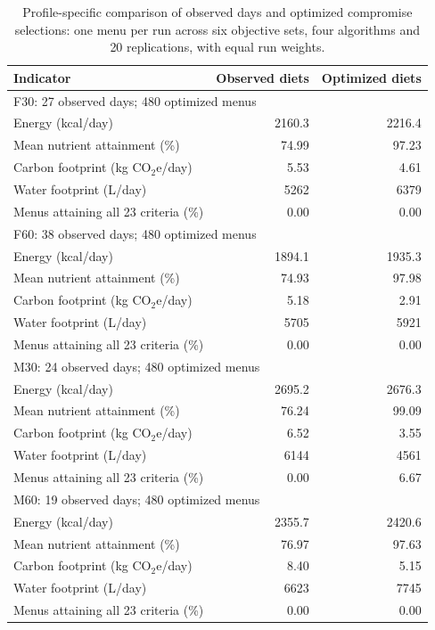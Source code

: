 \begin{table}[pos=h]
\centering\small
\caption{Profile-specific comparison of observed days and optimized compromise selections: one menu per run across six objective sets, four algorithms and 20 replications, with equal run weights.}
\label{tab:observed-profiles}
\begin{tabularx}{\textwidth}{Xrr}
\toprule
Indicator & Observed diets & Optimized diets \\
\midrule
\multicolumn{3}{l}{F30: 27 observed days; 480 optimized menus}\\
Energy (kcal/day) & 2160.3 & 2216.4 \\
\midrule
Mean nutrient attainment (\%) & 74.99 & 97.23 \\
\midrule
Carbon footprint (kg CO$_2$e/day) & 5.53 & 4.61 \\
\midrule
Water footprint (L/day) & 5262 & 6379 \\
\midrule
Menus attaining all 23 criteria (\%) & 0.00 & 0.00 \\
\midrule
\multicolumn{3}{l}{F60: 38 observed days; 480 optimized menus}\\
Energy (kcal/day) & 1894.1 & 1935.3 \\
\midrule
Mean nutrient attainment (\%) & 74.93 & 97.98 \\
\midrule
Carbon footprint (kg CO$_2$e/day) & 5.18 & 2.91 \\
\midrule
Water footprint (L/day) & 5705 & 5921 \\
\midrule
Menus attaining all 23 criteria (\%) & 0.00 & 0.00 \\
\midrule
\multicolumn{3}{l}{M30: 24 observed days; 480 optimized menus}\\
Energy (kcal/day) & 2695.2 & 2676.3 \\
\midrule
Mean nutrient attainment (\%) & 76.24 & 99.09 \\
\midrule
Carbon footprint (kg CO$_2$e/day) & 6.52 & 3.55 \\
\midrule
Water footprint (L/day) & 6144 & 4561 \\
\midrule
Menus attaining all 23 criteria (\%) & 0.00 & 6.67 \\
\midrule
\multicolumn{3}{l}{M60: 19 observed days; 480 optimized menus}\\
Energy (kcal/day) & 2355.7 & 2420.6 \\
\midrule
Mean nutrient attainment (\%) & 76.97 & 97.63 \\
\midrule
Carbon footprint (kg CO$_2$e/day) & 8.40 & 5.15 \\
\midrule
Water footprint (L/day) & 6623 & 7745 \\
\midrule
Menus attaining all 23 criteria (\%) & 0.00 & 0.00 \\
\bottomrule
\end{tabularx}
\end{table}
